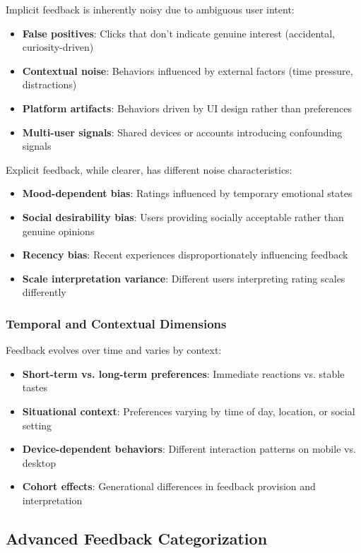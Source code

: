 Implicit feedback is inherently noisy due to ambiguous user intent:
\begin{itemize}
    \item \textbf{False positives}: Clicks that don't indicate genuine interest (accidental, curiosity-driven)
    \item \textbf{Contextual noise}: Behaviors influenced by external factors (time pressure, distractions)
    \item \textbf{Platform artifacts}: Behaviors driven by UI design rather than preferences
    \item \textbf{Multi-user signals}: Shared devices or accounts introducing confounding signals
\end{itemize}

Explicit feedback, while clearer, has different noise characteristics:
\begin{itemize}
    \item \textbf{Mood-dependent bias}: Ratings influenced by temporary emotional states
    \item \textbf{Social desirability bias}: Users providing socially acceptable rather than genuine opinions
    \item \textbf{Recency bias}: Recent experiences disproportionately influencing feedback
    \item \textbf{Scale interpretation variance}: Different users interpreting rating scales differently
\end{itemize}

\subsubsection{Temporal and Contextual Dimensions}

Feedback evolves over time and varies by context:
\begin{itemize}
    \item \textbf{Short-term vs. long-term preferences}: Immediate reactions vs. stable tastes
    \item \textbf{Situational context}: Preferences varying by time of day, location, or social setting
    \item \textbf{Device-dependent behaviors}: Different interaction patterns on mobile vs. desktop
    \item \textbf{Cohort effects}: Generational differences in feedback provision and interpretation
\end{itemize}

\subsection{Advanced Feedback Categorization}

